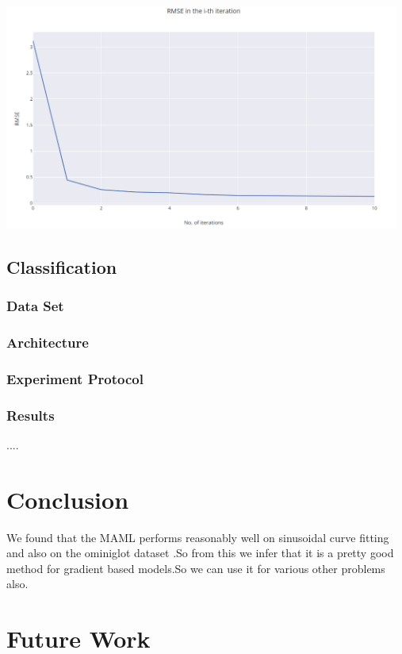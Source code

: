 \documentclass[a4paper]{article}
\begin{document}
\begin{center}
\includegraphics[width=13cm]{capture.png}
\end{center}

\subsection{Classification}
\subsubsection{Data Set}
\subsubsection{Architecture}
\subsubsection{Experiment Protocol}
\subsubsection{Results}

....

\section{Conclusion}

We found that the MAML performs reasonably well on sinusoidal curve fitting and also on the ominiglot dataset .So from this we infer that it is a pretty good method for gradient based models.So we can use it for various other problems also. 
\section{Future Work}
\end{document}
